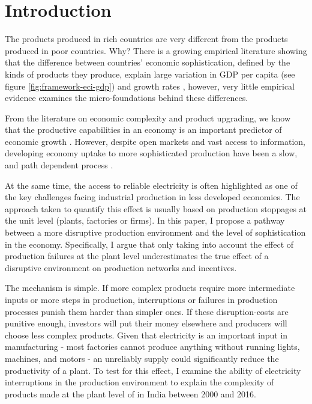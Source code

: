 \documentclass[11pt]{article}
\begin{document}



% 



\newpage


\section{Introduction}\label{sec:introduction}

The products produced in rich countries are very different from the products produced in poor countries. Why? There is a growing empirical literature showing that the difference between countries' economic sophistication, defined by the kinds of products they produce, explain large variation in GDP per capita (see figure \ref{fig:framework-eci-gdp}) and growth rates \citep{tacchella_dynamical_2018}, however, very little empirical evidence examines the micro-foundations behind these differences.

From the literature on economic complexity and product upgrading, we know that the productive capabilities in an economy is an important predictor of economic growth \citep{hausmann_network_2011}. However, despite open markets and vast access to information, developing economy uptake to more sophisticated production have been a slow, and path dependent process \citep{hidalgo_product_2007}.

At the same time, the access to reliable electricity is often highlighted as one of the key challenges facing industrial production in less developed economies. The approach taken to quantify this effect is usually based on production stoppages at the unit level (plants, factories or firms). In this paper, I propose a pathway between a more disruptive production environment and the level of sophistication in the economy. Specifically, I argue that only taking into account the effect of production failures at the plant level underestimates the true effect of a disruptive environment on production networks and incentives.

The mechanism is simple. If more complex products require more intermediate inputs or more steps in production, interruptions or failures in production processes punish them harder than simpler ones. If these disruption-costs are punitive enough, investors will put their money elsewhere and producers will choose less complex products. Given that electricity is an important input in manufacturing -  most factories cannot produce anything without running lights, machines, and motors - an unreliably supply could significantly reduce the productivity of a plant. To test for this effect, I examine the ability of electricity interruptions in the production environment to explain the complexity of products made at the plant level of in India between 2000 and 2016. 
\end{document}
